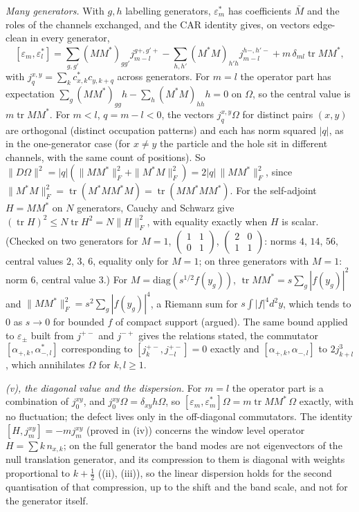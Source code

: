 \emph{Many generators.} With $g, h$ labelling generators, $\varepsilon_{m}^{*}$ has coefficients $\bar M$ and the roles of the channels exchanged, and the CAR identity gives, on vectors edge-clean in every generator,
\[
[\varepsilon_{m}, \varepsilon_{l}^{*}] = \sum_{g,g'}(MM^{*})_{gg'}j^{g+,g'+}_{m-l} - \sum_{h,h'}(M^{*}M)_{h'h}j^{h-,h'-}_{m-l} + m\,\delta_{ml}\operatorname{tr}MM^{*},
\]
with $j^{x,y}_{q} = \sum_{k}c_{x,k}^{*}c_{y,k+q}$ across generators. For $m = l$ the operator part has expectation $\sum_{g}(MM^{*})_{gg}h - \sum_{h}(M^{*}M)_{hh}h = 0$ on $\Omega$, so the central value is $m\operatorname{tr}MM^{*}$. For $m < l$, $q = m - l < 0$, the vectors $j^{x,y}_{q}\Omega$ for distinct pairs $(x, y)$ are orthogonal (distinct occupation patterns) and each has norm squared $|q|$, as in the one-generator case (for $x \ne y$ the particle and the hole sit in different channels, with the same count of positions). So $\|D\Omega\|^{2} = |q|(\|MM^{*}\|_{F}^{2} + \|M^{*}M\|_{F}^{2}) = 2|q|\,\|MM^{*}\|_{F}^{2}$, since $\|M^{*}M\|_{F}^{2} = \operatorname{tr}(M^{*}MM^{*}M) = \operatorname{tr}(MM^{*}MM^{*})$. For the self-adjoint $H = MM^{*}$ on $N$ generators, Cauchy and Schwarz give $(\operatorname{tr}H)^{2} \le N\operatorname{tr}H^{2} = N\|H\|_{F}^{2}$, with equality exactly when $H$ is scalar. (Checked on two generators for $M = 1$, $\begin{pmatrix}1&1\\0&1\end{pmatrix}$, $\begin{pmatrix}2&0\\1&1\end{pmatrix}$: norms $4$, $14$, $56$, central values $2$, $3$, $6$, equality only for $M = 1$; on three generators with $M = 1$: norm $6$, central value $3$.) For $M = \mathrm{diag}(s^{1/2}f(y_{g}))$, $\operatorname{tr}MM^{*} = s\sum_{g}|f(y_{g})|^{2}$ and $\|MM^{*}\|_{F}^{2} = s^{2}\sum_{g}|f(y_{g})|^{4}$, a Riemann sum for $s\int|f|^{4}d^{2}y$, which tends to $0$ as $s \to 0$ for bounded $f$ of compact support (argued). The same bound applied to $\varepsilon_{\pm}$ built from $j^{+-}$ and $j^{-+}$ gives the relations stated, the commutator $[\alpha_{+,k}, \alpha_{-,l}^{*}]$ corresponding to $[j^{+-}_{k}, j^{+-}_{-l}] = 0$ exactly and $[\alpha_{+,k}, \alpha_{-,l}]$ to $2j^{3}_{k+l}$, which annihilates $\Omega$ for $k, l \ge 1$.

\emph{(v), the diagonal value and the dispersion.} For $m = l$ the operator part is a combination of $j^{xy}_{0}$, and $j^{xy}_{0}\Omega = \delta_{xy}h\Omega$, so $[\varepsilon_{m}, \varepsilon_{m}^{*}]\Omega = m\operatorname{tr}MM^{*}\,\Omega$ exactly, with no fluctuation; the defect lives only in the off-diagonal commutators. The identity $[H, j^{xy}_{m}] = -mj^{xy}_{m}$ (proved in (iv)) concerns the window level operator $H = \sum k\,n_{x,k}$; on the full generator the band modes are not eigenvectors of the null translation generator, and its compression to them is diagonal with weights proportional to $k + \tfrac12$ ((ii), (iii)), so the linear dispersion holds for the second quantisation of that compression, up to the shift and the band scale, and not for the generator itself.
